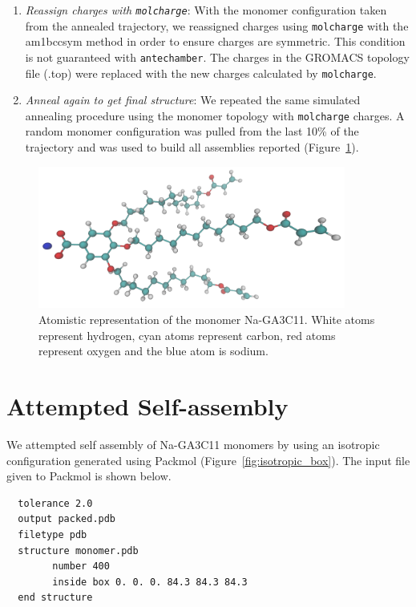 \documentclass{article}
\begin{document}
\begin{enumerate}
	\item \textit{Reassign charges with \texttt{molcharge}}: With the monomer
	configuration taken from the annealed trajectory, we reassigned charges using
	\texttt{molcharge} with the am1bccsym method in order to ensure charges 
	are symmetric. This condition is not guaranteed with \texttt{antechamber}. 
	The charges in the GROMACS topology file (.top) were replaced with the 
	new charges calculated by \texttt{molcharge}. 

	\item \textit{Anneal again to get final structure}: We repeated the
	same simulated annealing procedure using the monomer topology with
	\texttt{molcharge} charges. A random monomer configuration was pulled from the
	last 10\% of the trajectory and was used to build all assemblies reported
	(Figure~\ref{fig:monomer}).

  \end{enumerate} 
  \clearpage
  \begin{figure}[!htb]
	\centering
        \includegraphics[width=0.9\textwidth]{monomer.png}
	\caption{Atomistic representation of the monomer Na-GA3C11. White atoms
		represent hydrogen, cyan atoms represent carbon, red atoms represent oxygen and
		the blue atom is sodium.}\label{fig:monomer}
  \end{figure}
  
  \section{Attempted Self-assembly}\label{section:self_assembly}
  
  We attempted self assembly of Na-GA3C11 monomers by using an isotropic configuration
  generated using Packmol \cite{martinez_packmol:_2009} (Figure~\ref{fig:isotropic_box}).
  The input file given to Packmol is shown below.
  
  \lstset{language=bash}
  \begin{lstlisting}
  tolerance 2.0
  output packed.pdb
  filetype pdb
  structure monomer.pdb
  		number 400
  		inside box 0. 0. 0. 84.3 84.3 84.3
  end structure
  \end{lstlisting}
\end{document}
